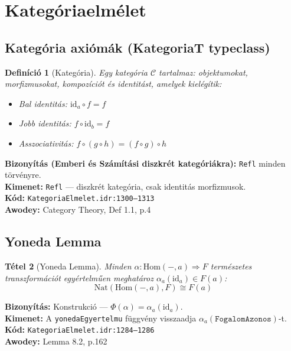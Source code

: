 \documentclass[12pt,a4paper]{article}
\newtheorem{tetel}{Tétel}
\newtheorem{definicio}[tetel]{Definíció}
\begin{document}
\section{Kategóriaelmélet}

\subsection{Kategória axiómák (KategoriaT typeclass)}

\begin{definicio}[Kategória]
Egy kategória $\mathcal{C}$ tartalmaz:
objektumokat, morfizmusokat, kompozíciót és identitást, amelyek kielégítik:
\begin{itemize}
\item Bal identitás: $\text{id}_a \circ f = f$
\item Jobb identitás: $f \circ \text{id}_b = f$
\item Asszociativitás: $f \circ (g \circ h) = (f \circ g) \circ h$
\end{itemize}
\end{definicio}

\textbf{Bizonyítás (Emberi és Számítási diszkrét kategóriákra):} \texttt{Refl} minden törvényre.\\
\textbf{Kimenet:} \texttt{Refl} — diszkrét kategória, csak identitás morfizmusok.\\
\textbf{Kód:} \texttt{KategoriaElmelet.idr:1300--1313}\\
\textbf{Awodey:} Category Theory, Def 1.1, p.4

\subsection{Yoneda Lemma}

\begin{tetel}[Yoneda Lemma]
Minden $\alpha: \text{Hom}(-,a) \Rightarrow F$ természetes transzformációt
egyértelműen meghatároz $\alpha_a(\text{id}_a) \in F(a)$:
$$\text{Nat}(\text{Hom}(-,a), F) \cong F(a)$$
\end{tetel}

\textbf{Bizonyítás:} Konstrukció — $\Phi(\alpha) = \alpha_a(\text{id}_a)$.\\
\textbf{Kimenet:} A \texttt{yonedaEgyertelmu} függvény visszaadja $\alpha_a(\texttt{FogalomAzonos})$-t.\\
\textbf{Kód:} \texttt{KategoriaElmelet.idr:1284--1286}\\
\textbf{Awodey:} Lemma 8.2, p.162
\end{document}
